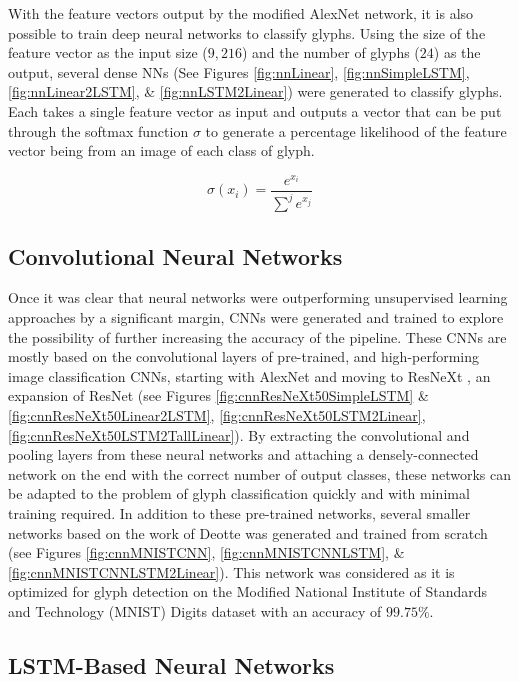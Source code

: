 With the feature vectors output by the modified AlexNet network, it is also possible to train deep neural networks to classify glyphs. Using the size of the feature vector as the input size ($9,216$) and the number of glyphs ($24$) as the output, several dense NNs (See Figures \ref{fig:nnLinear}, \ref{fig:nnSimpleLSTM}, \ref{fig:nnLinear2LSTM}, \& \ref{fig:nnLSTM2Linear}) were generated to classify glyphs. Each takes a single feature vector as input and outputs a vector that can be put through the softmax function $\sigma$  to generate a percentage likelihood of the feature vector being from an image of each class of glyph.

\begin{equation}
  \label{eq:softmax}
  \sigma(x_i)=\frac{e^{x_i}}{\sum^j{e^{x_j}}}
\end{equation}

\subsection{Convolutional Neural Networks}

Once it was clear that neural networks were outperforming unsupervised learning approaches by a significant margin, CNNs were generated and trained to explore the possibility of further increasing the accuracy of the pipeline.
These CNNs are mostly based on the convolutional layers of pre-trained, and high-performing image classification CNNs, starting with AlexNet \cite{Krizhevsky}  and moving to ResNeXt \cite{Xie}, an expansion of ResNet \cite{He} (see Figures \ref{fig:cnnResNeXt50SimpleLSTM} \& \ref{fig:cnnResNeXt50Linear2LSTM}, \ref{fig:cnnResNeXt50LSTM2Linear}, \ref{fig:cnnResNeXt50LSTM2TallLinear}). By extracting the convolutional and pooling layers from these neural networks and attaching a densely-connected network on the end with the correct number of output classes, these networks can be adapted to the problem of glyph classification quickly and with minimal training required. In addition to these pre-trained networks, several smaller networks based on the work of Deotte \cite{Deotte} was generated and trained from scratch (see Figures \ref{fig:cnnMNISTCNN}, \ref{fig:cnnMNISTCNNLSTM}, \& \ref{fig:cnnMNISTCNNLSTM2Linear}). This network was considered as it is optimized for glyph detection on the Modified National Institute of Standards and Technology (MNIST) Digits dataset \cite{Deng} with an accuracy of $99.75\%$.

\subsection{LSTM-Based Neural Networks}

